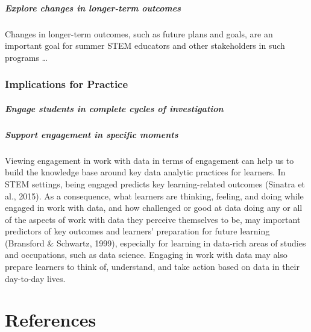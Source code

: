 \documentclass[]{msu-thesis}
\let\oldparagraph\paragraph
\renewcommand{\paragraph}[1]{\oldparagraph{#1}\mbox{}}
\theoremstyle{definition}
\theoremstyle{definition}
\theoremstyle{definition}
\theoremstyle{remark}
\begin{document}
\paragraph{Explore changes in longer-term
outcomes}\label{explore-changes-in-longer-term-outcomes}

Changes in longer-term outcomes, such as future plans and goals, are an
important goal for summer STEM educators and other stakeholders in such
programs \ldots{}

\subsection{Implications for Practice}\label{implications-for-practice}

\paragraph{Engage students in complete cycles of
investigation}\label{engage-students-in-complete-cycles-of-investigation}

\paragraph{Support engagement in specific
moments}\label{support-engagement-in-specific-moments}

Viewing engagement in work with data in terms of engagement can help us
to build the knowledge base around key data analytic practices for
learners. In STEM settings, being engaged predicts key learning-related
outcomes (Sinatra et al., 2015). As a consequence, what learners are
thinking, feeling, and doing while engaged in work with data, and how
challenged or good at data doing any or all of the aspects of work with
data they perceive themselves to be, may important predictors of key
outcomes and learners' preparation for future learning (Bransford \&
Schwartz, 1999), especially for learning in data-rich areas of studies
and occupations, such as data science. Engaging in work with data may
also prepare learners to think of, understand, and take action based on
data in their day-to-day lives.

\chapter{References}\label{references}
\end{document}
